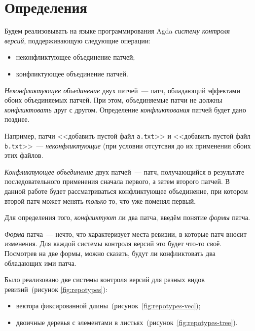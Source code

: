 
\section{Определения}

Будем реализовывать на языке программирования Agda \emph{систему
  контроля версий}, поддерживающую следующие операции:
\begin{itemize}
\item неконфликтующее объединение патчей;
\item конфликтующее объединение патчей.
\end{itemize}

\begin{definition}
  \emph{Неконфликтующее объединение} двух патчей~--- патч, обладающий
  эффектами обоих объединяемых патчей. При этом, объединяемые патчи не
  должны \emph{конфликтовать} друг с другом. Определение
  \emph{конфликтования} патчей будет дано позднее.
\end{definition}

Например, патчи <<добавить пустой файл \texttt{a.txt}>> и <<добавить
пустой файл \texttt{b.txt}>>~--- \emph{неконфликтующие} (при условии
отсутсвия до их применения обоих этих файлов.

\begin{definition}
  \emph{Конфликтующее объединение} двух патчей~--- патч, получающийся
  в результате последовательного применения сначала первого, а затем
  второго патчей. В данной работе будет рассматриваться конфликтующее
  объединение, при котором второй патч может менять \emph{только} то,
  что уже поменял первый.
\end{definition}

Для определения того, \emph{конфликтуют} ли два патча, введём понятие
\emph{формы} патча.

\begin{definition}
  \emph{Форма} патча~--- нечто, что характеризует места ревизии, в
  которые патч вносит изменения. Для каждой системы контроля версий
  это будет что-то своё. Посмотрев на две формы, можно сказать, будут
  ли конфликтовать два обладающих ими патча.
\end{definition}

Было реализовано две системы контроля версий для разных видов
ревизий~(рисунок \ref{fig:repotypes}):
\begin{itemize}
\item вектора фиксированной длины~(рисунок~\ref{fig:repotypes-vec});
\item двоичные деревья с элементами в
  листьях~(рисунок~\ref{fig:repotypes-tree}).
\end{itemize}

